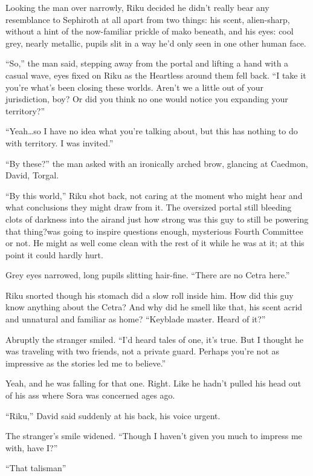 Looking the man over narrowly, Riku decided he didn't really bear any resemblance to Sephiroth at all apart from two things: his scent, alien-sharp, without a hint of the now-familiar prickle of mako beneath, and his eyes: cool grey, nearly metallic, pupils slit in a way he'd only seen in one other human face.

``So,'' the man said, stepping away from the portal and lifting a hand with a casual wave, eyes fixed on Riku as the Heartless around them fell back. ``I take it you're what's been closing these worlds. Aren't we a little out of your jurisdiction, boy? Or did you think no one would notice you expanding your territory?''

``Yeah\ldots so I have no idea what you're talking about, but this has nothing to do with territory. I was invited.''

``By these?'' the man asked with an ironically arched brow, glancing at Caedmon, David, Torgal.

``By this world,'' Riku shot back, not caring at the moment who might hear and what conclusions they might draw from it. The oversized portal still bleeding clots of darkness into the air\textemdash and just how strong was this guy to still be powering that thing?\textemdash was going to inspire questions enough, mysterious Fourth Committee or not. He might as well come clean with the rest of it while he was at it; at this point it could hardly hurt.

Grey eyes narrowed, long pupils slitting hair-fine. ``There are no Cetra here.''

Riku snorted though his stomach did a slow roll inside him. How did this guy know anything about the Cetra? And why did he smell like that, his scent acrid and unnatural and familiar as home? ``Keyblade master. Heard of it?''

Abruptly the stranger smiled. ``I'd heard tales of one, it's true. But I thought he was traveling with two friends, not a private guard. Perhaps you're not as impressive as the stories led me to believe.''

Yeah, and he was falling for that one. Right. Like he hadn't pulled his head out of his ass where Sora was concerned ages ago.

``Riku,'' David said suddenly at his back, his voice urgent.

The stranger's smile widened. ``Though I haven't given you much to impress me with, have I?''

``That talisman\textemdash''

